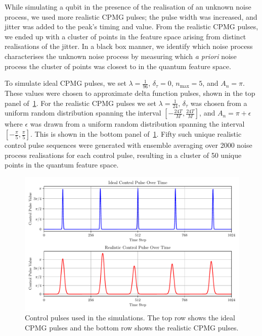 \documentclass[12pt]{iopart}
\begin{document}
While simulating a qubit in the presence of the realisation of an unknown noise process, we used more realistic CPMG pulses; the pulse width was increased, and jitter was added to the peak's timing and value. From the realistic CPMG pulses, we ended up with a cluster of points in the feature space arising from distinct realisations of the jitter. In a black box manner, we identify which noise process characterises the unknown noise process by measuring which \textit{a priori} noise process the cluster of points was closest to in the quantum feature space.

To simulate ideal CPMG pulses, we set $\lambda = \frac{1}{96}$, $\delta_{\tau} = 0$, $n_{\max} = 5$, and $A_n = \pi$. These values were chosen to approximate delta function pulses, shown in the top panel of~\cref{fig:control_pulses_visualisation}. For the realistic CPMG pulses we set $\lambda = \frac{1}{24}$, $\delta_{\tau}$ was chosen from a uniform random distribution spanning the interval $[-\frac{24T}{M}, \frac{24T}{M}]$, and $A_n = \pi + \epsilon$ where $\epsilon$ was drawn from a uniform random distribution spanning the interval $[-\frac{\pi}{5}, \frac{\pi}{5}]$. This is shown in the bottom panel of~\cref{fig:control_pulses_visualisation}. Fifty such unique realistic control pulse sequences were generated with ensemble averaging over 2000 noise process realisations for each control pulse, resulting in a cluster of 50 unique points in the quantum feature space.

\begin{figure}
    \centering
    \includegraphics[width=\textwidth]{figures/control_pulses.pdf}
    \caption{Control pulses used in the simulations. The top row shows the ideal CPMG pulses and the bottom row shows the realistic CPMG pulses.}
    \label{fig:control_pulses_visualisation}
\end{figure}
\end{document}
